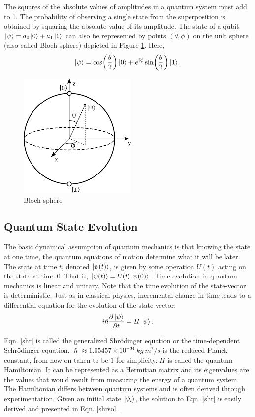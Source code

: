 \documentclass[{../RL_for_QSP.tex}]{subfiles}
\begin{document}
The squares of the absolute values of amplitudes in a quantum system must add to 1. The probability of observing a single state from the superposition is obtained by squaring the absolute value of its amplitude. The state of a qubit $\ket{\psi} = a_0\ket{0} + a_1\ket{1}$ can also be represented by points $(\theta, \phi)$ on the unit sphere (also called Bloch sphere) depicted in Figure \ref{Bloch sphere}. Here, 
$$\ket{\psi} = \cos(\frac{\theta}{2})\ket{0} + e^{i\phi}\sin(\frac{\theta}{2})\ket{1}.$$ 

\begin{figure}[H]
	\centering
	\includegraphics[scale=0.75]{Bloch Sphere.png}
	\caption{Bloch sphere}
	\label{Bloch sphere}
\end{figure}

\subsection{Quantum State Evolution}

The basic dynamical assumption of quantum mechanics is that knowing the state at one time, the quantum equations of motion determine what it will be later. The state at time $t$, denoted $\ket{\psi(t)}$, is given by some operation $U(t)$ acting on the state at time $0$. That is, $\ket{\psi(t)} = U(t)\ket{\psi(0)}$. Time evolution in quantum mechanics is linear and unitary. Note that the time evolution of the state-vector is deterministic. Just as in classical physics, incremental change in time leads to a differential equation for the evolution of the state vector:
\begin{equation} \label{shr}
    i \hslash \frac{\partial \ket{\psi}}{\partial t} = H \ket{\psi}.
\end{equation}

Eqn. \ref{shr} is called the generalized Shrödinger equation or the time-dependent Schrödinger equation. $\hslash \approx 1.05457 \times 10^{-34} \: kg \: m^2/s$ is the reduced Planck constant, from now on taken to be $1$ for simplicity. $H$ is called the quantum Hamiltonian. It can be represented as a Hermitian matrix and its eigenvalues are the values that would result from measuring the energy of a quantum system. The Hamiltonian differs between quantum systems and is often derived through experimentation. Given an initial state $\ket{\psi_i}$, the solution to Eqn. \ref{shr} is easily derived and presented in Eqn. \ref{shrsol}.
\end{document}
